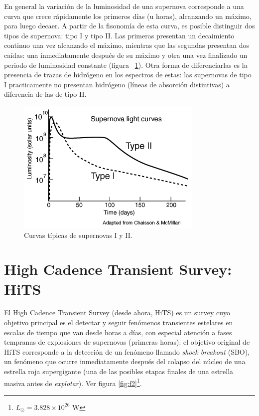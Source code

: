 En general la variaci\'on de la luminosidad de una supernova corresponde a una curva que crece r\'apidamente los primeros d\'ias (u horas), alcanzando un m\'aximo, para luego decaer. A partir de la fisonom\'ia de esta curva, es posible distinguir dos tipos de supernova: tipo I y tipo II. Las primeras presentan un decaimiento continuo una vez alcanzado el m\'aximo, mientras que las segundas presentan dos ca\'idas: una inmediatamente despu\'es de su m\'aximo y otra una vez finalizado un periodo de luminosidad constante (figura ~\ref{fig:f1}). Otra forma de diferenciarlas es la presencia de trazas de hidr\'ogeno en los espectros de estas: las supernovas de tipo I practicamente no presentan hidr\'ogeno (l\'ineas de absorci\'on distintivas) a diferencia de las de tipo II.\bigskip

\begin{figure}[h!]
\centering
\includegraphics[scale=.8]{images/sntyp.png}
\caption{Curvas t\'ipicas de supernovas I y II.}
\label{fig:f1}
\end{figure}


\section{High Cadence Transient Survey: HiTS}

El High Cadence Transient Survey (desde ahora, HiTS) es un survey cuyo objetivo principal es el detectar y seguir fen\'omenos transientes estelares en escalas de tiempo que van desde horas a d\'ias, con especial atenci\'on a fases tempranas de explosiones de supernovas (primeras horas): el objetivo original de HiTS corresponde a la detecci\'on de un fen\'omeno llamado \textit{shock breakout} (SBO), un fen\'omeno que ocurre inmediatamente despu\'es del colapso del n\'ucleo de una estrella roja supergigante (una de las posibles etapas finales de una estrella masiva antes de \textit{explotar}). Ver figura \ref{fig:f2}\footnote{$L_{\odot}= 3.828 \times 10^{26}$ W}.

